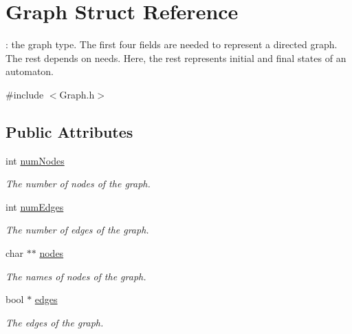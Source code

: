 \hypertarget{structGraph}{}\section{Graph Struct Reference}
\label{structGraph}


\+: the graph type. The first four fields are needed to represent a directed graph. The rest depends on needs. Here, the rest represents initial and final states of an automaton.  




{\ttfamily \#include $<$Graph.\+h$>$}

\subsection*{Public Attributes}
\begin{DoxyCompactItemize}
\item 
\mbox{\label{structGraph_ad3db12d7f8327a6717fd161d694e43c0}} 
int \hyperlink{structGraph_ad3db12d7f8327a6717fd161d694e43c0}{num\+Nodes}
\begin{DoxyCompactList}\small\item\em The number of nodes of the graph. \end{DoxyCompactList}\item 
\mbox{\label{structGraph_a4f98dc06b0c1e32b27fa26efc0e11777}} 
int \hyperlink{structGraph_a4f98dc06b0c1e32b27fa26efc0e11777}{num\+Edges}
\begin{DoxyCompactList}\small\item\em The number of edges of the graph. \end{DoxyCompactList}\item 
\mbox{\label{structGraph_aa08cad811e4bd8af7d8592d215009205}} 
char $\ast$$\ast$ \hyperlink{structGraph_aa08cad811e4bd8af7d8592d215009205}{nodes}
\begin{DoxyCompactList}\small\item\em The names of nodes of the graph. \end{DoxyCompactList}\item 
\mbox{\label{structGraph_a62f3e0acacf556871b976b1c7ad66c54}} 
bool $\ast$ \hyperlink{structGraph_a62f3e0acacf556871b976b1c7ad66c54}{edges}
\begin{DoxyCompactList}\small\item\em The edges of the graph. \end{DoxyCompactList}\item 
$$
\end{DoxyCompactItemize}
